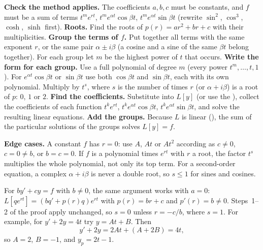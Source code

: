 \documentclass[10pt]{scrartcl}
\newenvironment{howto}[1]{\begin{mdframed}[style=howtostyle,frametitle={#1}]}{\end{mdframed}}
\begin{document}
\begin{howto}{How to find a particular solution by undetermined coefficients}
  \begin{steps}
    \ii \textbf{Check the method applies.} The coefficients $a,b,c$ must be constants, and $f$ must be a sum of terms $t^me^{rt}$, $t^me^{\alpha t}\cos\beta t$, $t^me^{\alpha t}\sin\beta t$ (rewrite $\sin^2$, $\cos^3$, $\cosh$, $\sinh$ first).
    \ii \textbf{Roots.} Find the roots of $p(r)=ar^2+br+c$ with their multiplicities.
    \ii \textbf{Group the terms of $f$.} Put together all terms with the same exponent $r$, or the same pair $\alpha\pm i\beta$ (a cosine and a sine of the same $\beta t$ belong together). For each group let $m$ be the highest power of $t$ that occurs.
    \ii \textbf{Write the form for each group.} Use a full polynomial of degree $m$ (every power $t^m,\dots,t,1$). For $e^{\alpha t}\cos\beta t$ or $\sin\beta t$ use both $\cos\beta t$ and $\sin\beta t$, each with its own polynomial. Multiply by $t^s$, where $s$ is the number of times $r$ (or $\alpha+i\beta$) is a root of $p$: $0$, $1$ or $2$.
    \ii \textbf{Find the coefficients.} Substitute into $L[y]$ (or use the ), collect the coefficients of each function $t^ke^{rt}$, $t^ke^{\alpha t}\cos\beta t$, $t^ke^{\alpha t}\sin\beta t$, and solve the resulting linear equations.
    \ii \textbf{Add the groups.} Because $L$ is linear (), the sum of the particular solutions of the groups solves $L[y]=f$.
  \end{steps}
  \textbf{Edge cases.} A constant $f$ has $r=0$: use $A$, $At$ or $At^2$ according as $c\neq 0$, $c=0\neq b$, or $b=c=0$. If $f$ is a polynomial times $e^{rt}$ with $r$ a root, the factor $t^s$ multiplies the whole polynomial, not only its top term. For a second-order equation, a complex $\alpha+i\beta$ is never a double root, so $s\le 1$ for sines and cosines.
\end{howto}

\begin{example*}
  For $by'+cy=f$ with $b\neq 0$, the same argument works with $a=0$: $L[qe^{rt}]=(bq'+p(r)q)e^{rt}$ with $p(r)=br+c$ and $p'(r)=b\neq 0$. Steps~1--2 of the proof apply unchanged, so $s=0$ unless $r=-c/b$, where $s=1$. For example, for $y'+2y=4t$ try $y=At+B$. Then
  \[
    y'+2y=2At+(A+2B)=4t,
  \]
  so $A=2$, $B=-1$, and $y_p=2t-1$.
\end{example*}
\end{document}
